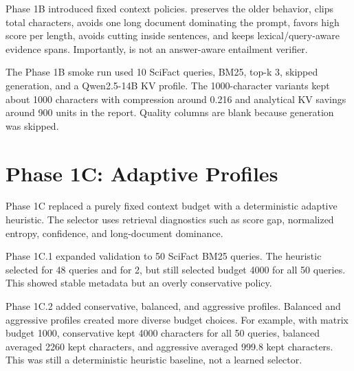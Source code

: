 Phase 1B introduced fixed context policies.  preserves the older behavior,  clips total characters,  avoids one long document dominating the prompt,  favors high score per length,  avoids cutting inside sentences, and  keeps lexical/query-aware evidence spans. Importantly,  is not an answer-aware entailment verifier.

The Phase 1B smoke run used 10 SciFact queries, BM25, top-k 3, skipped generation, and a Qwen2.5-14B KV profile. The 1000-character variants kept about 1000 characters with compression around 0.216 and analytical KV savings around 900 units in the report. Quality columns are blank because generation was skipped.

\section{Phase 1C: Adaptive Profiles}

Phase 1C replaced a purely fixed context budget with a deterministic adaptive heuristic. The selector uses retrieval diagnostics such as score gap, normalized entropy, confidence, and long-document dominance.

Phase 1C.1 expanded validation to 50 SciFact BM25 queries. The heuristic selected  for 48 queries and  for 2, but still selected budget 4000 for all 50 queries. This showed stable metadata but an overly conservative policy.

Phase 1C.2 added conservative, balanced, and aggressive profiles. Balanced and aggressive profiles created more diverse budget choices. For example, with matrix budget 1000, conservative kept 4000 characters for all 50 queries, balanced averaged 2260 kept characters, and aggressive averaged 999.8 kept characters. This was still a deterministic heuristic baseline, not a learned selector.
